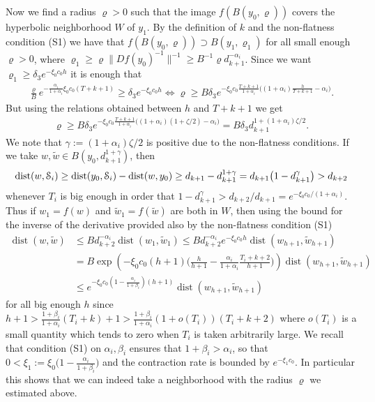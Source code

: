 \documentclass[reqno,12pt,a4paper]{amsart}
\theoremstyle{plain}
\theoremstyle{definition}
\begin{document}
Now we find a radius ${\varrho}>0$ such that the image
$f(B(y_0,{\varrho}))$ covers the hyperbolic neighborhood $W$ of
$y_1$. By the definition of $k$ and the non-flatness
condition (S1) we have that $f(B(y_0,{\varrho}))\supset
B(y_1,{\varrho}_1)$ for all small enough ${\varrho}>0$, where
${\varrho}_1\ge {\varrho} \|Df(y_0)^{-1}\|^{-1} \ge B^{-1}{\varrho}
d_{k+1}^{-\alpha_i}$. Since we want ${\varrho}_1\ge \delta_3
e^{-\xi_0 c_0 h}$ it is enough that
\begin{align*}
  \frac{\varrho}{B} e^{-\frac{\alpha_i}{1+\alpha_i}\xi_0 c_0
    (T+k+1)}
  \ge
  \delta_3 e^{-\xi_0 c_0 h}
  \iff
  {\varrho}\ge B\delta_3 e^{-\xi_0 c_0\frac{T+k+1}{1+\alpha_i}
    \big( (1+\alpha_i)\frac{h}{T+k+1} - \alpha_i\big)}.
\end{align*}
But using the relations obtained between $h$ and $T+k+1$ we get
\begin{align*}
  {\varrho}\ge B\delta_3 e^{-\xi_0 c_0\frac{T+k+1}{1+\alpha_i}
    \big( (1+\alpha_i)(1+\zeta/2) - \alpha_i\big)}
  =
  B\delta_3 d_{k+1}^{1+(1+\alpha_i)\zeta/2}.
\end{align*}
We note that $\gamma:=(1+\alpha_i)\zeta/2$ is positive due
to the non-flatness conditions.  If we take $w,\tilde w\in
B(y_0, d_{k+1}^{1+\gamma})$, then
\begin{align}\label{eq:V0-dentro}
  {\operatorname{dist}}(w,{\EuScript{S}}_i)\ge{\operatorname{dist}}(y_0,{\EuScript{S}}_i) - {\operatorname{dist}}(w,y_0)
  \ge d_{k+1}-d_{k+1}^{1+\gamma}
  = d_{k+1}\big(1-d_{k+1}^{\gamma}\big)
  >d_{k+2}
\end{align}
whenever $T_i$ is big enough in order that
$1-d_{k+1}^\gamma> d_{k+2}/d_{k+1}=e^{-\xi_0 c_0
  /(1+\alpha_i)}$.
Thus if $w_1=f(w) $ and $ \tilde w_1=f(\tilde w)$ are both
in $W$, then using the bound for the inverse of the
derivative provided also by the non-flatness condition (S1)
\begin{align}
  {\operatorname{dist}}(w,\tilde w)
  &\le
    B d_{k+2}^{-\alpha_i}{\operatorname{dist}}(w_1,\tilde w_1)
    \le
    B d_{k+2}^{-\alpha_i} e^{-\xi_0 c_0 h}{\operatorname{dist}}
    (w_{h+1},\tilde w_{h+1})\nonumber
    \\
  &=
  B\exp\left(-\xi_0 c_0 (h+1) \big(\frac{h}{h+1} -
    \frac{\alpha_i}{1+\alpha_i}\frac{T_i+k+2}{h+1}\big)\right)
  {\operatorname{dist}}(w_{h+1},\tilde w_{h+1})\nonumber
  \\
  &\le  \label{eq:xi-1}
  e^{-\xi_0 c_0 (1-\frac{\alpha_i}{1+\beta_i}) (h+1)}
  {\operatorname{dist}}(w_{h+1},\tilde w_{h+1})
\end{align}
for all big enough
$h$ since $h+1>\frac{1+\beta_i}{1+\alpha_i}(T_i+k)+1>
\frac{1+\beta_i}{1+\alpha_i}(1+o(T_i))(T_i+k+2)$ where
$o(T_i)$ is a small quantity which tends to zero when $T_i$
is taken arbitrarily large. We recall that condition (S1) on
$\alpha_i,\beta_i$ ensures that $1+\beta_i>\alpha_i$, so
that $0<\xi_1:=\xi_0\big(1-\frac{\alpha_i}{1+\beta_i}\big)$
and the contraction rate is bounded by $e^{-\xi_1 c_0}$. In
particular this shows that we can indeed take a neighborhood
with the radius ${\varrho}$ we estimated above.
\end{document}

